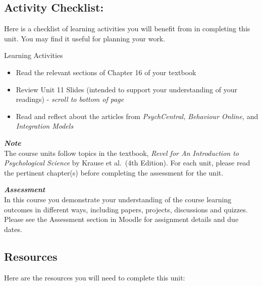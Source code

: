 \documentclass[
]{book}
\providecommand{\tightlist}{%
  \setlength{\itemsep}{0pt}\setlength{\parskip}{0pt}}
\begin{document}
\hypertarget{activity-checklist-10}{%
\subsection*{Activity Checklist:}\label{activity-checklist-10}}

Here is a checklist of learning activities you will benefit from in completing this unit. You may find it useful for planning your work.

\begin{reflect}
{Learning Activities}

\begin{itemize}
\tightlist
\item
  Read the relevant sections of Chapter 16 of your textbook
\item
  Review Unit 11 Slides (intended to support your understanding of your readings) - \emph{scroll to bottom of page}
\item
  Read and reflect about the articles from \emph{PsychCentral,} \emph{Behaviour Online,} and \emph{Integration Models}
\end{itemize}
\end{reflect}

\begin{caution}
\textbf{\emph{Note}}\\
The course units follow topics in the textbook, \emph{Revel for An Introduction to Psychological Science} by Krause et al.~(4th Edition). For each unit, please read the pertinent chapter(s) before completing the assessment for the unit.
\end{caution}

\begin{assessment}
\textbf{\emph{Assessment}}\\
In this course you demonstrate your understanding of the course learning outcomes in different ways, including papers, projects, discussions and quizzes. Please see the Assessment section in Moodle for assignment details and due dates.
\end{assessment}

\hypertarget{resources-10}{%
\subsection*{Resources}\label{resources-10}}

Here are the resources you will need to complete this unit:
\end{document}
